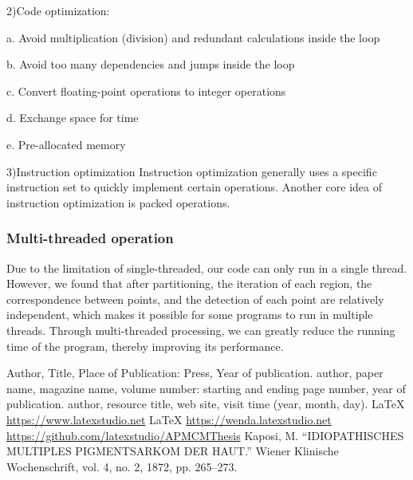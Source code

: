 \documentclass{apmcmthesis}
\begin{document}
2)Code optimization:


a. Avoid multiplication (division) and redundant calculations inside the loop


b. Avoid too many dependencies and jumps inside the loop


c. Convert floating-point operations to integer operations


d. Exchange space for time


e. Pre-allocated memory


3)Instruction optimization
Instruction optimization generally uses a specific instruction set to quickly implement certain operations. Another core idea of instruction optimization is packed operations.

\subsubsection{Multi-threaded operation}
Due to the limitation of single-threaded, our code can only run in a single thread. However, we found that after partitioning, the iteration of each region, the correspondence between points, and the detection of each point are relatively independent, which makes it possible for some programs to run in multiple threads. Through multi-threaded processing, we can greatly reduce the running time of the program, thereby improving its performance.




\begin{thebibliography}{9}%
   Author, Title, Place of Publication: Press, Year of publication.
   author, paper name, magazine name, volume number: starting and ending
  page number, year of publication.
   author, resource title, web site, visit time (year, month, day).
   \LaTeX{} \url{https://www.latexstudio.net}
   \LaTeX{} \url{https://wenda.latexstudio.net}
    \url{https://github.com/latexstudio/APMCMThesis}
   Kaposi, M. “IDIOPATHISCHES MULTIPLES PIGMENTSARKOM DER HAUT.” Wiener Klinische Wochenschrift, vol. 4, no. 2, 1872, pp. 265–273.
\end{thebibliography}

\newpage
\end{document}
